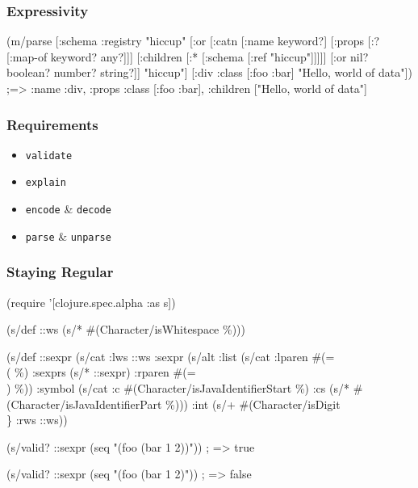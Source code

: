 \documentclass{beamer}
\begin{document}

\begin{frame}[fragile]
\frametitle{Expressivity}

{\scriptsize
\begin{semiverbatim}
(m/parse
  [:schema {:registry {"hiccup" [:or
                                 [:catn
                                  [:name keyword?]
                                  [:props [:? [:map-of keyword? any?]]]
                                  [:children [:* [:schema [:ref "hiccup"]]]]]
                                 [:or nil? boolean? number? string?]]}}
   "hiccup"]
  [:div {:class [:foo :bar]}
   "Hello, world of data"])
;=> {:name :div, :props {:class [:foo :bar]}, :children ["Hello, world of data"]}
\end{semiverbatim}
}

\end{frame}


\begin{frame}
\frametitle{Requirements}

\begin{itemize}
\item \texttt{validate}
\item \texttt{explain}
\item \texttt{encode} \& \texttt{decode}
\item \texttt{parse} \& \texttt{unparse}
\end{itemize}
\end{frame}


\begin{frame}[fragile]
\frametitle{Staying Regular}

{\scriptsize
\begin{semiverbatim}
(require '[clojure.spec.alpha :as s])

(s/def ::ws (s/* \#(Character/isWhitespace \%)))

(s/def ::sexpr
  (s/cat
    :lws ::ws
    :sexpr (s/alt
             :list (s/cat :lparen \#(= \\( \%)
                          :sexprs (s/* ::sexpr)
                          :rparen #(= \\) \%))
             :symbol (s/cat :c #(Character/isJavaIdentifierStart \%)
                            :cs (s/* #(Character/isJavaIdentifierPart \%)))
             :int (s/+ \#(Character/isDigit \\\}%
    :rws ::ws))

(s/valid? ::sexpr (seq "(foo (bar 1 2))"))
; => true

(s/valid? ::sexpr (seq "(foo (bar 1 2)"))
; => false
\end{semiverbatim}
}

\end{frame}
\end{document}
